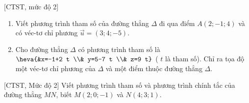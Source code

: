 \begin{bt}%
[CTST, mức độ 2]
	\begin{enumerate}
		\item  Viết phương trình tham số của đường thẳng $\Delta$ đi qua điểm $A(2;-1;4)$ và có véc-tơ chỉ phương $\overrightarrow{u}=(3;4;-5)$.
		\item Cho đường thẳng $\Delta$ có phương trình tham số là $\heva{&x=-1+2 t \\& y=5-7 t \\& z=9 t}$ ( $t$ là tham số).
		Chỉ ra tọa độ một véc-tơ chỉ phương của $\Delta$ và một điểm thuộc đường thẳng $\Delta$.
	\end{enumerate}
\end{bt}

\begin{bt}%
[CTST, Mức độ 2]
	Viết phương trình tham số và phương trình chính tắc của đường thẳng $MN$, biết $M\left( 2;0;-1 \right)$ và $N\left( 4;3;1 \right)$.
\end{bt}

